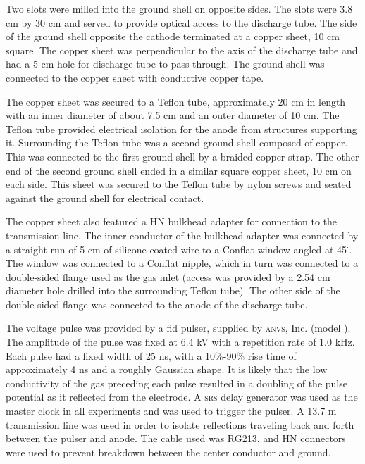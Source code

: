 Two slots were milled into the ground shell on opposite sides. The slots were
3.8 cm by 30 cm and served to provide optical access to the discharge tube. The
side of the ground shell opposite the cathode terminated at a copper sheet, 10
cm square. The copper sheet was perpendicular to the axis of the discharge tube
and had a 5 cm hole for discharge tube to pass through. The ground shell was
connected to the copper sheet with conductive copper tape.

The copper sheet was secured to a Teflon tube, approximately 20 cm in length
with an inner diameter of about 7.5 cm and an outer diameter of 10 cm. The
Teflon tube provided electrical isolation for the anode from structures
supporting it. Surrounding the Teflon tube was a second ground shell composed of
copper. This was connected to the first ground shell by a braided copper strap.
The other end of the second ground shell ended in a similar square copper sheet,
10 cm on each side. This sheet was secured to the Teflon tube by nylon screws
and seated against the ground shell for electrical contact.

The copper sheet also featured a HN bulkhead adapter for connection to the
transmission line. The inner conductor of the bulkhead adapter was connected by
a straight run of 5 cm of silicone-coated wire to a Conflat window angled at
45$^\cdot$. The window was connected to a Conflat nipple, which in turn was
connected to a double-sided flange used as the gas inlet (access was provided by
a 2.54 cm diameter hole drilled into the surrounding Teflon tube). The other
side of the double-sided flange was connected to the anode of the discharge
tube.

The voltage pulse was provided by a \acs{fid} pulser, supplied by \textsc{anvs},
Inc. (model ). The amplitude of the pulse was fixed at 6.4 kV
with a repetition rate of 1.0 kHz. Each pulse had a fixed width of 25 ns, with a
10\%-90\% rise time of approximately 4 ns and a roughly Gaussian shape. It is
likely that the low conductivity of the gas preceding each pulse resulted in a
doubling of the pulse potential as it reflected from the electrode. A
\textsc{srs}  delay generator was used as the master clock in all
experiments and was used to trigger the pulser. A 13.7 m transmission line was
used in order to isolate reflections traveling back and forth between the pulser
and anode. The cable used was RG213, and HN connectors were used to prevent
breakdown between the center conductor and ground.

